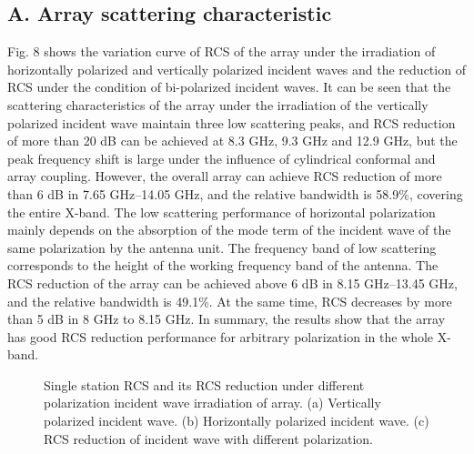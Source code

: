 \documentclass[USenglish]{article}
\theoremstyle{dgthm}
\theoremstyle{dgdef}
\begin{document}
\subsection*{A. Array scattering characteristic}
Fig. 8 shows the variation curve of RCS of the array under the irradiation of horizontally polarized and vertically polarized incident waves and the reduction of RCS under the condition of bi-polarized incident waves. It can be seen that the scattering characteristics of the array under the irradiation of the vertically polarized incident wave maintain three low scattering peaks, and RCS reduction of more than 20 dB can be achieved at 8.3 GHz, 9.3 GHz and 12.9 GHz, but the peak frequency shift is large under the influence of cylindrical conformal and array coupling. However, the overall array can achieve RCS reduction of more than 6 dB in 7.65 GHz--14.05 GHz, and the relative bandwidth is 58.9\%, covering the entire X-band. The low scattering performance of horizontal polarization mainly depends on the absorption of the mode term of the incident wave of the same polarization by the antenna unit. The frequency band of low scattering corresponds to the height of the working frequency band of the antenna. The RCS reduction of the array can be achieved above 6 dB in 8.15 GHz--13.45 GHz, and the relative bandwidth is 49.1\%. At the same time, RCS decreases by more than 5 dB in 8 GHz to 8.15 GHz. In summary, the results show that the array has good RCS reduction performance for arbitrary polarization in the whole X-band.
\begin{figure}[htbp]
	\centering
	\caption{Single station RCS and its RCS reduction under different polarization incident wave irradiation of array. (a) Vertically polarized incident wave. (b) Horizontally polarized incident wave. (c) RCS reduction of incident wave with different polarization.}
\end{figure}
\end{document}
